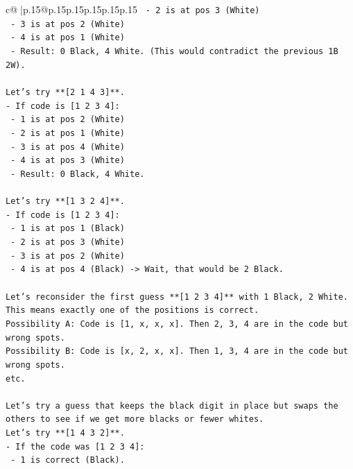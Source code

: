 \documentclass{article}
\begin{document}
{\begin{supertabular}{c@{$\;$}|p{.15\linewidth}@{}p{.15\linewidth}p{.15\linewidth}p{.15\linewidth}p{.15\linewidth}p{.15\linewidth}}
{{{\texttt{  {-} 2 is at pos 3 (White)} \\
\texttt{  {-} 3 is at pos 2 (White)} \\
\texttt{  {-} 4 is at pos 1 (White)} \\
\texttt{  {-} Result: 0 Black, 4 White. (This would contradict the previous 1B 2W).} \\
\\ 
\texttt{Let's try **{[}2 1 4 3{]}**.} \\
\texttt{{-} If code is {[}1 2 3 4{]}:} \\
\texttt{  {-} 1 is at pos 2 (White)} \\
\texttt{  {-} 2 is at pos 1 (White)} \\
\texttt{  {-} 3 is at pos 4 (White)} \\
\texttt{  {-} 4 is at pos 3 (White)} \\
\texttt{  {-} Result: 0 Black, 4 White.} \\
\\ 
\texttt{Let's try **{[}1 3 2 4{]}**.} \\
\texttt{{-} If code is {[}1 2 3 4{]}:} \\
\texttt{  {-} 1 is at pos 1 (Black)} \\
\texttt{  {-} 2 is at pos 3 (White)} \\
\texttt{  {-} 3 is at pos 2 (White)} \\
\texttt{  {-} 4 is at pos 4 (Black) {-}> Wait, that would be 2 Black.} \\
\\ 
\texttt{Let's reconsider the first guess **{[}1 2 3 4{]}** with 1 Black, 2 White.} \\
\texttt{This means exactly one of the positions is correct.} \\
\texttt{Possibility A: Code is {[}1, x, x, x{]}. Then 2, 3, 4 are in the code but wrong spots.} \\
\texttt{Possibility B: Code is {[}x, 2, x, x{]}. Then 1, 3, 4 are in the code but wrong spots.} \\
\texttt{etc.} \\
\\ 
\texttt{Let's try a guess that keeps the black digit in place but swaps the others to see if we get more blacks or fewer whites.} \\
\texttt{Let's try **{[}1 4 3 2{]}**.} \\
\texttt{{-} If the code was {[}1 2 3 4{]}:} \\
\texttt{  {-} 1 is correct (Black).} \\
}}}
\end{supertabular}}
\end{document}
